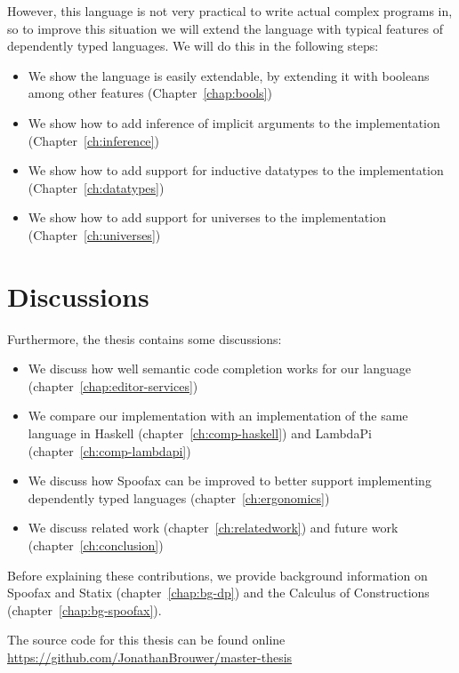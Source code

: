 However, this language is not very practical to write actual complex programs in, so to improve this situation we will extend the language with typical features of dependently typed languages. We will do this in the following steps:
\begin{itemize}
	\item We show the language is easily extendable, by extending it with booleans among other features (Chapter~\ref{chap:bools})
	\item We show how to add inference of implicit arguments to the implementation (Chapter~\ref{ch:inference})
	\item We show how to add support for inductive datatypes to the implementation (Chapter~\ref{ch:datatypes})
	\item We show how to add support for universes to the implementation (Chapter~\ref{ch:universes})
\end{itemize}

\section*{Discussions}

Furthermore, the thesis contains some discussions:
\begin{itemize}
	\item We discuss how well semantic code completion works for our language (chapter~\ref{chap:editor-services})
	\item We compare our implementation with an implementation of the same language in Haskell (chapter~\ref{ch:comp-haskell}) and LambdaPi (chapter~\ref{ch:comp-lambdapi})
	\item We discuss how Spoofax can be improved to better support implementing dependently typed languages (chapter~\ref{ch:ergonomics})
	\item We discuss related work (chapter~\ref{ch:relatedwork}) and future work (chapter~\ref{ch:conclusion})
\end{itemize}

\noindent Before explaining these contributions, we provide background information on Spoofax and Statix (chapter~\ref{chap:bg-dp}) and the Calculus of Constructions (chapter~\ref{chap:bg-spoofax}).

The source code for this thesis can be found online \\ \url{https://github.com/JonathanBrouwer/master-thesis}

